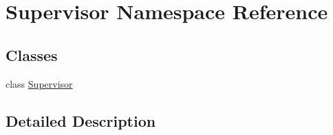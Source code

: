 \hypertarget{namespace_supervisor}{}\section{Supervisor Namespace Reference}
\label{namespace_supervisor}
\subsection*{Classes}
\begin{DoxyCompactItemize}
\item 
class \hyperlink{class_supervisor_1_1_supervisor}{Supervisor}
\end{DoxyCompactItemize}


\subsection{Detailed Description}
\begin{DoxyVerb}\end{DoxyVerb}
 